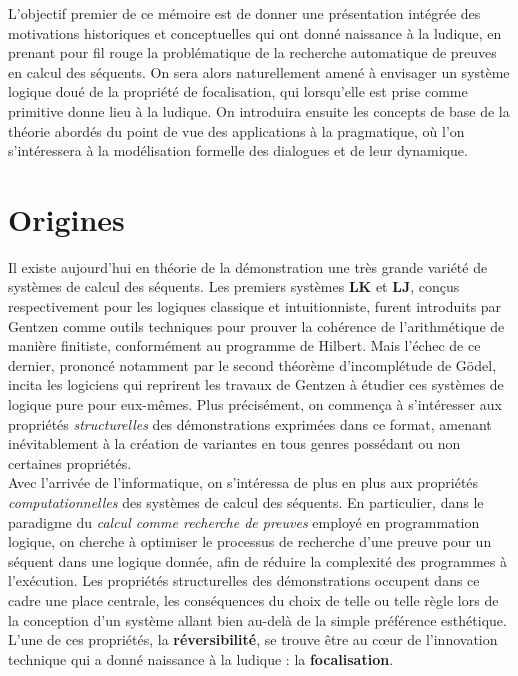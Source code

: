 \documentclass[11pt]{report}
\begin{document}
L'objectif premier de ce mémoire est de donner une présentation intégrée des motivations historiques et conceptuelles qui ont donné naissance à la ludique, en prenant pour fil rouge la problématique de la recherche automatique de preuves en calcul des séquents. On sera alors naturellement amené à envisager un système logique doué de la propriété de focalisation, qui lorsqu'elle est prise comme primitive donne lieu à la ludique. On introduira ensuite les concepts de base de la théorie abordés du point de vue des applications à la pragmatique, où l'on s'intéressera à la modélisation formelle des dialogues et de leur dynamique.

\chapter{Origines}

Il existe aujourd'hui en théorie de la démonstration une très grande variété de systèmes de calcul des séquents. Les premiers systèmes $\mathbf{LK}$ et $\mathbf{LJ}$, conçus respectivement pour les logiques classique et intuitionniste, furent introduits par Gentzen comme outils techniques pour prouver la cohérence de l'arithmétique de manière finitiste, conformément au programme de Hilbert. Mais l'échec de ce dernier, prononcé notamment par le second théorème d'incomplétude de Gödel, incita les logiciens qui reprirent les travaux de Gentzen à étudier ces systèmes de logique pure pour eux-mêmes. Plus précisément, on commença à s'intéresser aux propriétés \emph{structurelles} des démonstrations exprimées dans ce format, amenant inévitablement à la création de variantes en tous genres possédant ou non certaines propriétés.\\

Avec l'arrivée de l'informatique, on s'intéressa de plus en plus aux propriétés \emph{computationnelles} des systèmes de calcul des séquents. En particulier, dans le paradigme du \emph{calcul comme recherche de preuves} employé en programmation logique, on cherche à optimiser le processus de recherche d'une preuve pour un séquent dans une logique donnée, afin de réduire la complexité des programmes à l'exécution. Les propriétés structurelles des démonstrations occupent dans ce cadre une place centrale, les conséquences du choix de telle ou telle règle lors de la conception d'un système allant bien au-delà de la simple préférence esthétique. L'une de ces propriétés, la \textbf{réversibilité}, se trouve être au c\oe{}ur de l'innovation technique qui a donné naissance à la ludique : la \textbf{focalisation}.
\end{document}
